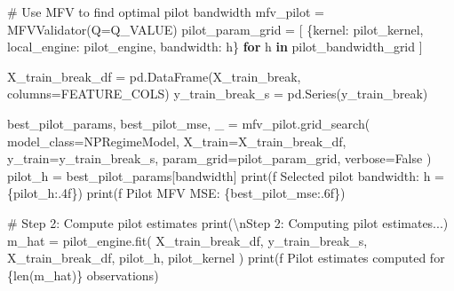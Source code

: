 \documentclass[
  letterpaper,
  DIV=11,
  numbers=noendperiod]{scrartcl}
\newenvironment{Shaded}{\begin{snugshade}}{\end{snugshade}}
\newcommand{\BuiltInTok}[1]{\textcolor[rgb]{0.00,0.23,0.31}{#1}}
\newcommand{\CharTok}[1]{\textcolor[rgb]{0.13,0.47,0.30}{#1}}
\newcommand{\CommentTok}[1]{\textcolor[rgb]{0.37,0.37,0.37}{#1}}
\newcommand{\ControlFlowTok}[1]{\textcolor[rgb]{0.00,0.23,0.31}{\textbf{#1}}}
\newcommand{\KeywordTok}[1]{\textcolor[rgb]{0.00,0.23,0.31}{\textbf{#1}}}
\newcommand{\NormalTok}[1]{\textcolor[rgb]{0.00,0.23,0.31}{#1}}
\newcommand{\OperatorTok}[1]{\textcolor[rgb]{0.37,0.37,0.37}{#1}}
\newcommand{\SpecialCharTok}[1]{\textcolor[rgb]{0.37,0.37,0.37}{#1}}
\newcommand{\SpecialStringTok}[1]{\textcolor[rgb]{0.13,0.47,0.30}{#1}}
\newcommand{\StringTok}[1]{\textcolor[rgb]{0.13,0.47,0.30}{#1}}
\newcommand{\VariableTok}[1]{\textcolor[rgb]{0.07,0.07,0.07}{#1}}
\begin{document}
\begin{Shaded}
\begin{Highlighting}[]
\CommentTok{\# Use MFV to find optimal pilot bandwidth}
\NormalTok{mfv\_pilot }\OperatorTok{=}\NormalTok{ MFVValidator(Q}\OperatorTok{=}\NormalTok{Q\_VALUE)}
\NormalTok{pilot\_param\_grid }\OperatorTok{=}\NormalTok{ [}
\NormalTok{    \{}\StringTok{\textquotesingle{}kernel\textquotesingle{}}\NormalTok{: pilot\_kernel, }\StringTok{\textquotesingle{}local\_engine\textquotesingle{}}\NormalTok{: pilot\_engine, }\StringTok{\textquotesingle{}bandwidth\textquotesingle{}}\NormalTok{: h\}}
    \ControlFlowTok{for}\NormalTok{ h }\KeywordTok{in}\NormalTok{ pilot\_bandwidth\_grid}
\NormalTok{]}

\NormalTok{X\_train\_break\_df }\OperatorTok{=}\NormalTok{ pd.DataFrame(X\_train\_break, columns}\OperatorTok{=}\NormalTok{FEATURE\_COLS)}
\NormalTok{y\_train\_break\_s }\OperatorTok{=}\NormalTok{ pd.Series(y\_train\_break)}

\NormalTok{best\_pilot\_params, best\_pilot\_mse, \_ }\OperatorTok{=}\NormalTok{ mfv\_pilot.grid\_search(}
\NormalTok{    model\_class}\OperatorTok{=}\NormalTok{NPRegimeModel,}
\NormalTok{    X\_train}\OperatorTok{=}\NormalTok{X\_train\_break\_df,}
\NormalTok{    y\_train}\OperatorTok{=}\NormalTok{y\_train\_break\_s,}
\NormalTok{    param\_grid}\OperatorTok{=}\NormalTok{pilot\_param\_grid,}
\NormalTok{    verbose}\OperatorTok{=}\VariableTok{False}
\NormalTok{)}
\NormalTok{pilot\_h }\OperatorTok{=}\NormalTok{ best\_pilot\_params[}\StringTok{\textquotesingle{}bandwidth\textquotesingle{}}\NormalTok{]}
\BuiltInTok{print}\NormalTok{(}\SpecialStringTok{f\textquotesingle{}  Selected pilot bandwidth: h = }\SpecialCharTok{\{}\NormalTok{pilot\_h}\SpecialCharTok{:.4f\}}\SpecialStringTok{\textquotesingle{}}\NormalTok{)}
\BuiltInTok{print}\NormalTok{(}\SpecialStringTok{f\textquotesingle{}  Pilot MFV MSE: }\SpecialCharTok{\{}\NormalTok{best\_pilot\_mse}\SpecialCharTok{:.6f\}}\SpecialStringTok{\textquotesingle{}}\NormalTok{)}

\CommentTok{\# Step 2: Compute pilot estimates}
\BuiltInTok{print}\NormalTok{(}\StringTok{\textquotesingle{}}\CharTok{\textbackslash{}n}\StringTok{Step 2: Computing pilot estimates...\textquotesingle{}}\NormalTok{)}
\NormalTok{m\_hat }\OperatorTok{=}\NormalTok{ pilot\_engine.fit(}
\NormalTok{    X\_train\_break\_df, y\_train\_break\_s,}
\NormalTok{    X\_train\_break\_df, pilot\_h, pilot\_kernel}
\NormalTok{)}
\BuiltInTok{print}\NormalTok{(}\SpecialStringTok{f\textquotesingle{}  Pilot estimates computed for }\SpecialCharTok{\{}\BuiltInTok{len}\NormalTok{(m\_hat)}\SpecialCharTok{\}}\SpecialStringTok{ observations\textquotesingle{}}\NormalTok{)}


\end{Highlighting}
\end{Shaded}
\end{document}
